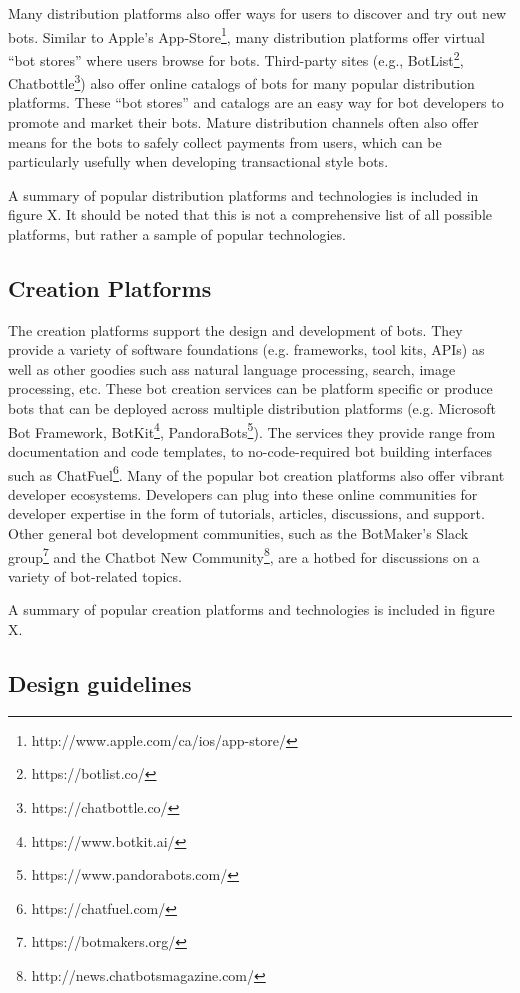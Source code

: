 \documentclass{sig-alternate}
\begin{document}
	Many distribution platforms also offer ways for users to discover and try out new bots. Similar to Apple's App-Store\footnote{http://www.apple.com/ca/ios/app-store/}, many distribution platforms offer virtual ``bot stores'' where users browse for bots. Third-party sites (e.g., BotList\footnote{https://botlist.co/}, Chatbottle\footnote{https://chatbottle.co/}) also offer online catalogs of bots for many popular distribution platforms. These ``bot stores'' and catalogs are an easy way for bot developers to promote and market their bots. Mature distribution channels often also offer means for the bots to safely collect payments from users, which can be particularly usefully when developing transactional style bots.

	A summary of popular distribution platforms and technologies is included in figure X.  It should be noted that this is not a comprehensive list of all possible platforms, but rather a sample of popular technologies.

	\subsection{Creation Platforms}

	The creation platforms support the design and development of bots. They provide a variety of software foundations (e.g. frameworks, tool kits, APIs) as well as other goodies such ass natural language processing, search, image processing, etc. These bot creation services can be platform specific or produce bots that can be deployed across multiple distribution platforms (e.g. Microsoft Bot Framework, BotKit\footnote{https://www.botkit.ai/}, PandoraBots\footnote{https://www.pandorabots.com/}). The services they provide range from documentation and code templates, to no-code-required bot building interfaces such as ChatFuel\footnote{https://chatfuel.com/}. 
	Many of the popular bot creation platforms also offer vibrant developer ecosystems. Developers can plug into these online communities for developer expertise in the form of tutorials, articles, discussions, and support.  Other general bot development communities, such as the BotMaker's Slack group\footnote{https://botmakers.org/} and the Chatbot New Community\footnote{http://news.chatbotsmagazine.com/}, are a hotbed for discussions on a variety of bot-related topics.

	A summary of popular creation platforms and technologies is included in figure X.

	\subsection{Design guidelines}
\end{document}

